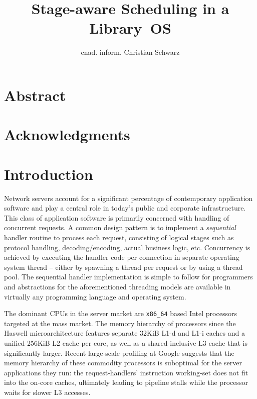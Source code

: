 \documentclass[12pt,a4paper]{book}
\begin{document}
\frontmatter
{}

\title{Stage-aware Scheduling in a Library~OS}
\author{cnad. inform. Christian Schwarz}
\maketitle



\chapter{Abstract}
\chapter{Acknowledgments}

\mainmatter
\cleardoublepage
{}
{}
\tableofcontents

\chapter{Introduction}
Network servers account for a significant percentage of contemporary application software and play a central role in today's public and corporate infrastructure.
This class of application software is primarily concerned with handling of concurrent requests.
A common design pattern is to implement a \emph{sequential} handler routine to process each request, consisting of logical stages such as protocol handling, decoding/encoding, actual business logic, etc.
Concurrency is achieved by executing the handler code per connection in separate operating system thread -- either by spawning a thread per request or by using a thread pool.
The sequential handler implementation is simple to follow for programmers and abstractions for the aforementioned threading models are available in virtually any programming language and operating system.

The dominant CPUs in the server market are \texttt{x86\_64} based Intel processors targeted at the mass market.
The memory hierarchy of processors since the Haswell microarchitecture features separate 32KiB L1-d and L1-i caches and a unified 256KiB L2 cache per core, as well as a shared inclusive L3 cache that is significantly larger.
Recent large-scale profiling at Google suggests that the memory hierarchy of these commodity processors is suboptimal for the server applications they run:
the request-handlers' instruction working-set does not fit into the on-core caches, ultimately leading to pipeline stalls while the processor waits for slower L3 accesses.\cite{kanev2015profiling}
\end{document}
